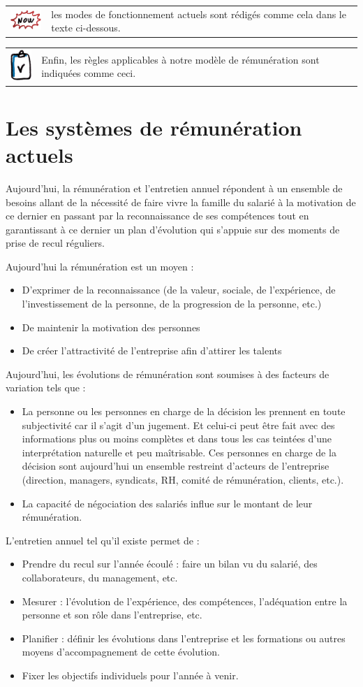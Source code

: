 \documentclass[12pt]{article}
\newcommand{\actuel}[1]{%
  \begin{tcolorbox}[colframe=DarkButter,boxrule=2pt,arc=4pt,left=6pt,right=6pt,top=6pt,bottom=6pt,boxsep=0pt,colback=Aluminium1]
    \begin{tabular}{m{1.5cm} m{11cm}}
      \includegraphics[width=1.5cm]{includes/now} & #1 \\
    \end{tabular}
  \end{tcolorbox}
}
\newcommand{\regle}[1]{%
  \begin{tcolorbox}[colframe=DarkOrange,boxrule=2pt,arc=4pt,left=6pt,right=6pt,top=6pt,bottom=6pt,boxsep=0pt,colback=LightOrange]
    \begin{tabular}{m{1.0cm} m{11.5cm}}
      \includegraphics[width=1.0cm]{includes/rules} & #1 \\
    \end{tabular}
  \end{tcolorbox}
}
\begin{document}
  \actuel{les modes de fonctionnement actuels sont rédigés comme cela dans le texte ci-dessous.}

  \regle{Enfin, les règles applicables à notre modèle de rémunération sont indiquées comme ceci.}

\section{Les systèmes de rémunération actuels}
 Aujourd’hui, la rémunération et l'entretien annuel répondent à un ensemble de besoins allant de la nécessité de faire vivre la famille du salarié à la motivation de ce dernier en passant par la reconnaissance de ses compétences tout en garantissant à ce dernier un plan d’évolution qui s’appuie sur des moments de prise de recul réguliers.

Aujourd’hui la rémunération est un moyen :
 \begin{itemize}
   \item D’exprimer de la reconnaissance (de la valeur, sociale, de l’expérience, de l’investissement de la personne, de la progression de la personne, etc.)
   \item De maintenir la motivation des personnes
   \item De créer l’attractivité de l’entreprise afin d’attirer les talents
 \end{itemize}

Aujourd’hui, les évolutions de rémunération sont soumises à des facteurs de variation tels que :
 \begin{itemize}
   \item La personne ou les personnes en charge de la décision les prennent en toute subjectivité car il s’agit d’un jugement. Et celui-ci peut être fait avec des informations plus ou moins complètes et dans tous les cas teintées d’une interprétation naturelle et peu maîtrisable. Ces personnes en charge de la décision sont aujourd’hui un ensemble restreint d’acteurs de l’entreprise (direction, managers, syndicats, RH, comité de rémunération, clients, etc.).
   \item La capacité de négociation des salariés influe sur le montant de leur rémunération.
 \end{itemize}

L'entretien annuel tel qu’il existe permet de : 
 \begin{itemize}
   \item Prendre du recul sur l’année écoulé : faire un bilan vu du salarié, des collaborateurs, du management, etc.
   \item Mesurer : l’évolution de l’expérience, des compétences, l’adéquation entre la personne et son rôle dans l’entreprise, etc.
   \item Planifier : définir les évolutions dans l’entreprise et les formations ou autres moyens d'accompagnement de cette évolution.
   \item Fixer les objectifs individuels pour l’année à venir. 
 \end{itemize}
\end{document}
